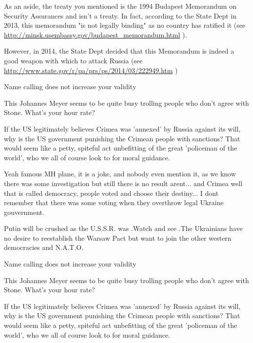 \begin{itemize}
\begin{itemize}
As an aside, the treaty you mentioned is the 1994 Budapest Memorandum on
Security Assurances and isn't a treaty. In fact, according to the State Dept in
2013, this memorandum "is not legally binding" as no country has ratified it
(see \url{http://minsk.usembassy.gov/budapest_memorandum.html} ).

However, in 2014, the State Dept decided that this Memorandum is indeed a good
weapon with which to attack Russia (see
\url{http://www.state.gov/r/pa/prs/ps/2014/03/222949.htm} )

Name calling does not increase your validity

This Johannes Meyer seems to be quite busy trolling people who don't agree with Stone. What's your hour rate?


If the US legitimately believes Crimea was 'annexed' by Russia against its
will, why is the US government punishing the Crimean people with sanctions?
That would seem like a petty, spiteful act unbefitting of the great 'policeman
of the world', who we all of course look to for moral guidance.


Yeah famous MH plane, it is a joke, and nobody even mention it, as we know
there was some investigation but still there is no result arent... and Crimea
well that is called democracy, people voted and choose their destiny... I dont
remember that there was some voting when they overthrow legal Ukraine
gouvernment.


Putin will be crushed as the U.S.S.R. was .Watch and see .The Ukrainians have
no desire to reestablish the Warsaw Pact but want to join the other western
democracies and N.A.T.O.

Name calling does not increase your validity

This Johannes Meyer seems to be quite busy trolling people who don't agree with Stone. What's your hour rate?


If the US legitimately believes Crimea was 'annexed' by Russia against its
will, why is the US government punishing the Crimean people with sanctions?
That would seem like a petty, spiteful act unbefitting of the great 'policeman
of the world', who we all of course look to for moral guidance.


\end{itemize}
\end{itemize}
